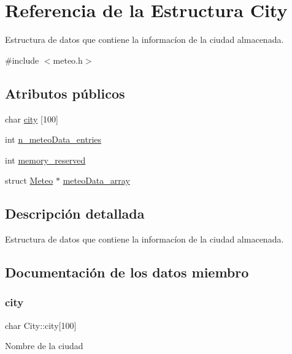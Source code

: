 \hypertarget{struct_city}{}\section{Referencia de la Estructura City}
\label{struct_city}


Estructura de datos que contiene la informacíon de la ciudad almacenada.  




{\ttfamily \#include $<$meteo.\+h$>$}

\subsection*{Atributos públicos}
\begin{DoxyCompactItemize}
\item 
char \hyperlink{struct_city_ada7169f27bdf6f773e6dec3b0e86b6fa}{city} \mbox{[}100\mbox{]}
\item 
int \hyperlink{struct_city_a6951eca7655b259b4304a3e354c09b55}{n\+\_\+meteo\+Data\+\_\+entries}
\item 
int \hyperlink{struct_city_a50ba069ee5425a89a433c5bf670fa5ea}{memory\+\_\+reserved}
\item 
struct \hyperlink{struct_meteo}{Meteo} $\ast$ \hyperlink{struct_city_ac2402d56376a07836fa62dca29c89dab}{meteo\+Data\+\_\+array}
\end{DoxyCompactItemize}


\subsection{Descripción detallada}
Estructura de datos que contiene la informacíon de la ciudad almacenada. 

\subsection{Documentación de los datos miembro}
\mbox{\label{struct_city_ada7169f27bdf6f773e6dec3b0e86b6fa}} 
\subsubsection{\texorpdfstring{city}{city}}
{\footnotesize\ttfamily char City\+::city\mbox{[}100\mbox{]}}

Nombre de la ciudad \mbox{\label{struct_city_a50ba069ee5425a89a433c5bf670fa5ea}} 
